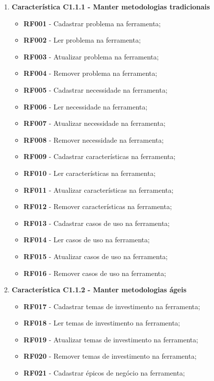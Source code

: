 	\begin{enumerate}
		\item \textbf{Característica C1.1.1 - Manter metodologias tradicionais}
			\begin{itemize}
				\item \textbf{RF001} - Cadastrar problema na ferramenta;
				\item \textbf{RF002} - Ler problema na ferramenta;
				\item \textbf{RF003} - Atualizar problema na ferramenta;
				\item \textbf{RF004} - Remover problema na ferramenta;
				\item \textbf{RF005} - Cadastrar necessidade na ferramenta;
				\item \textbf{RF006} - Ler necessidade na ferramenta;
				\item \textbf{RF007} - Atualizar necessidade na ferramenta;
				\item \textbf{RF008} - Remover necessidade na ferramenta;
				\item \textbf{RF009} - Cadastrar características na ferramenta;
				\item \textbf{RF010} - Ler características na ferramenta;
				\item \textbf{RF011} - Atualizar características na ferramenta;
				\item \textbf{RF012} - Remover características na ferramenta;
				\item \textbf{RF013} - Cadastrar casos de uso na ferramenta;
				\item \textbf{RF014} - Ler casos de uso na ferramenta;
				\item \textbf{RF015} - Atualizar casos de uso na ferramenta;
				\item \textbf{RF016} - Remover casos de uso na ferramenta;
			\end{itemize}
		\item \textbf{Característica C1.1.2 - Manter metodologias ágeis}
			\begin{itemize}
				\item \textbf{RF017} - Cadastrar temas de investimento na ferramenta;
				\item \textbf{RF018} - Ler temas de investimento na ferramenta;
				\item \textbf{RF019} - Atualizar temas de investimento na ferramenta;
				\item \textbf{RF020} - Remover temas de investimento na ferramenta;
				\item \textbf{RF021} - Cadastrar épicos de negócio na ferramenta;

\end{itemize}
\end{enumerate}
